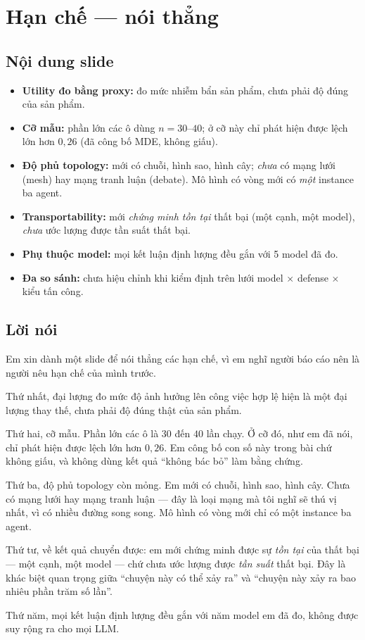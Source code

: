 \documentclass[11pt,a4paper]{article}
\newcommand{\slide}[1]{\section{#1}}
\newcommand{\noidung}{\subsection*{Nội dung slide}}
\newcommand{\loinoi}{\subsection*{Lời nói}}
\begin{document}
\slide{Hạn chế --- nói thẳng}

\noidung
\begin{itemize}
  \item \textbf{Utility đo bằng proxy:} đo mức nhiễm bẩn sản phẩm, chưa phải độ đúng của
        sản phẩm.
  \item \textbf{Cỡ mẫu:} phần lớn các ô dùng $n = 30$--$40$; ở cỡ này chỉ phát hiện được
        lệch lớn hơn $0{,}26$ (đã công bố MDE, không giấu).
  \item \textbf{Độ phủ topology:} mới có chuỗi, hình sao, hình cây; \emph{chưa} có mạng
        lưới (mesh) hay mạng tranh luận (debate). Mô hình có vòng mới có \emph{một}
        instance ba agent.
  \item \textbf{Transportability:} mới \emph{chứng minh tồn tại} thất bại (một cạnh,
        một model), \emph{chưa} ước lượng được tần suất thất bại.
  \item \textbf{Phụ thuộc model:} mọi kết luận định lượng đều gắn với 5 model đã đo.
  \item \textbf{Đa so sánh:} chưa hiệu chỉnh khi kiểm định trên lưới
        model $\times$ defense $\times$ kiểu tấn công.
\end{itemize}

\loinoi
Em xin dành một slide để nói thẳng các hạn chế, vì em nghĩ người báo cáo nên là người
nêu hạn chế của mình trước.

Thứ nhất, đại lượng đo mức độ ảnh hưởng lên công việc hợp lệ hiện là một đại lượng thay
thế, chưa phải độ đúng thật của sản phẩm.

Thứ hai, cỡ mẫu. Phần lớn các ô là $30$ đến $40$ lần chạy. Ở cỡ đó, như em đã nói, chỉ
phát hiện được lệch lớn hơn $0{,}26$. Em công bố con số này trong bài chứ không giấu,
và không dùng kết quả ``không bác bỏ'' làm bằng chứng.

Thứ ba, độ phủ topology còn mỏng. Em mới có chuỗi, hình sao, hình cây. Chưa có mạng
lưới hay mạng tranh luận --- đây là loại mạng mà tôi nghĩ sẽ thú vị nhất, vì có nhiều
đường song song. Mô hình có vòng mới chỉ có một instance ba agent.

Thứ tư, về kết quả chuyển được: em mới chứng minh được sự \emph{tồn tại} của thất bại
--- một cạnh, một model --- chứ chưa ước lượng được \emph{tần suất} thất bại. Đây là
khác biệt quan trọng giữa ``chuyện này có thể xảy ra'' và ``chuyện này xảy ra bao nhiêu
phần trăm số lần''.

Thứ năm, mọi kết luận định lượng đều gắn với năm model em đã đo, không được suy rộng ra
cho mọi LLM.
\end{document}

